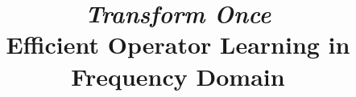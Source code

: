 \newcommand{\ourmethod}{$\tt{T1}$}

\newcommand{\se}[1]{{\color{magenta} [SE: #1]}}
\newcommand{\fb}[1]{{\color{orange} [FB: #1]}}


 \allowdisplaybreaks[4]

\usepackage{tabularx}
\usepackage{fontawesome}


\newcommand{\TextAndSymbol}[2]{%
  \begin{tabularx}{\textwidth}{X >{\raggedleft}>{\raggedright\arraybackslash}X}%
    #1 & #2
  \end{tabularx}%
}
\newcommand{\config}[1]{\TextAndSymbol{%
    \textbf{#1}%
  }{\faCogs}}


\usepackage{thmtools} 
\usepackage{thm-restate}



\usepackage[nameinlink,capitalise]{cleveref}

\title{\textit{Transform Once}\\ Efficient Operator Learning in Frequency Domain}

